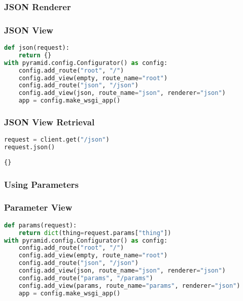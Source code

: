 \documentclass{article}
\begin{document}
\hypertarget{json-renderer}{%
\subsubsection{JSON Renderer}\label{json-renderer}}

\begin{frame}[fragile]
\frametitle{JSON View}

\begin{lstlisting}[language=Python]
def json(request):
    return {}
with pyramid.config.Configurator() as config:
    config.add_route("root", "/")
    config.add_view(empty, route_name="root")
    config.add_route("json", "/json")
    config.add_view(json, route_name="json", renderer="json")
    app = config.make_wsgi_app()
\end{lstlisting}

\end{frame}

\begin{frame}[fragile]
\frametitle{JSON View Retrieval}

\begin{lstlisting}[language=Python]
request = client.get("/json")
request.json()
\end{lstlisting}

\begin{lstlisting}
{}
\end{lstlisting}

\end{frame}

\hypertarget{using-parameters}{%
\subsubsection{Using Parameters}\label{using-parameters}}

\begin{frame}[fragile]
\frametitle{Parameter View}

\begin{lstlisting}[language=Python]
def params(request):
    return dict(thing=request.params["thing"])
with pyramid.config.Configurator() as config:
    config.add_route("root", "/")
    config.add_view(empty, route_name="root")
    config.add_route("json", "/json")
    config.add_view(json, route_name="json", renderer="json")
    config.add_route("params", "/params")
    config.add_view(params, route_name="params", renderer="json")
    app = config.make_wsgi_app()
\end{lstlisting}

\end{frame}
\end{document}
